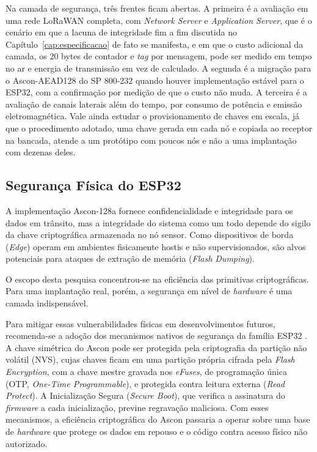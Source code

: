 Na camada de segurança, três frentes ficam abertas. A primeira é a avaliação em uma rede LoRaWAN completa, com \textit{Network Server} e \textit{Application Server}, que é o cenário em que a lacuna de integridade fim a fim discutida no Capítulo~\ref{cap:especificacao} de fato se manifesta, e em que o custo adicional da camada, os 20 bytes de contador e \textit{tag} por mensagem, pode ser medido em tempo no ar e energia de transmissão em vez de calculado. A segunda é a migração para o Ascon-AEAD128 do SP 800-232 quando houver implementação estável para o ESP32, com a confirmação por medição de que o custo não muda. A terceira é a avaliação de canais laterais além do tempo, por consumo de potência e emissão eletromagnética. Vale ainda estudar o provisionamento de chaves em escala, já que o procedimento adotado, uma chave gerada em cada nó e copiada ao receptor na bancada, atende a um protótipo com poucos nós e não a uma implantação com dezenas deles.


\subsection{Segurança Física do ESP32}
\label{subsec:seguranca_fisica}
A implementação Ascon-128a fornece confidencialidade e integridade para os dados em trânsito, mas a integridade do sistema como um todo depende do sigilo da chave criptográfica armazenada no nó sensor. Como dispositivos de borda (\textit{Edge}) operam em ambientes fisicamente hostis e não supervisionados, são alvos potenciais para ataques de extração de memória (\textit{Flash Dumping}).

O escopo desta pesquisa concentrou-se na eficiência das primitivas criptográficas. Para uma implantação real, porém, a segurança em nível de \textit{hardware} é uma camada indispensável.

Para mitigar essas vulnerabilidades físicas em desenvolvimentos futuros, recomenda-se a adoção dos mecanismos nativos de segurança da família ESP32 \cite{espressif2024flash,kosemen2021tamper}. A chave simétrica do Ascon pode ser protegida pela criptografia da partição não volátil (NVS), cujas chaves ficam em uma partição própria cifrada pela \textit{Flash Encryption}, com a chave mestre gravada nos \textit{eFuses}, de programação única (OTP, \textit{One-Time Programmable}), e protegida contra leitura externa (\textit{Read Protect}). A Inicialização Segura (\textit{Secure Boot}), que verifica a assinatura do \textit{firmware} a cada inicialização, previne regravação maliciosa. Com esses mecanismos, a eficiência criptográfica do Ascon passaria a operar sobre uma base de \textit{hardware} que protege os dados em repouso e o código contra acesso físico não autorizado.

